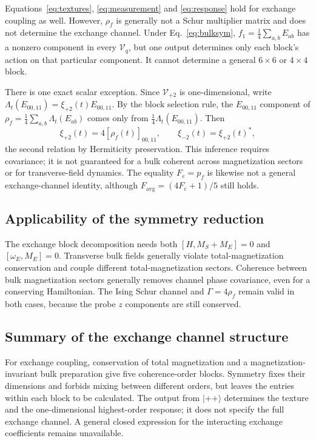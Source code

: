 \documentclass[11pt,a4paper]{article}
\newcommand{\ket}[1]{\lvert #1\rangle}
\begin{document}
Equations~\eqref{eq:textures}, \eqref{eq:measurement} and
\eqref{eq:response} hold for exchange coupling as well. However,
$\rho_f$ is generally not a Schur multiplier matrix and does not
determine the exchange channel. Under Eq.~\eqref{eq:bulksym},
$f_1=\frac14\sum_{a,b}E_{ab}$ has a nonzero component in every
$\mathcal V_q$, but one output determines only each block's action on
that particular component. It cannot determine a general $6\times6$ or
$4\times4$ block.

There is one exact scalar exception. Since $\mathcal V_{+2}$ is
one-dimensional, write $\Lambda_t(E_{00,11})=\xi_{+2}(t)E_{00,11}$. By the
block selection rule, the $E_{00,11}$ component of
$\rho_f=\frac14\sum_{a,b}\Lambda_t(E_{ab})$ comes only from
$\frac14\Lambda_t(E_{00,11})$. Then
\begin{equation}
 \xi_{+2}(t)=4[\rho_f(t)]_{00,11},\qquad
 \xi_{-2}(t)=\xi_{+2}(t)^*,
\end{equation}
the second relation by Hermiticity preservation.
This inference requires covariance; it is not guaranteed for a bulk
coherent across magnetization sectors or for transverse-field dynamics.
The equality $F_e=p_f$ is likewise not a general exchange-channel
identity, although $F_{\mathrm{avg}}=(4F_e+1)/5$ still holds.

\subsection{Applicability of the symmetry reduction}

The exchange block decomposition needs both
$[H,M_S+M_E]=0$ and $[\omega_E,M_E]=0$. Transverse bulk fields generally
violate total-magnetization conservation and couple different
total-magnetization sectors. Coherence between bulk magnetization
sectors generally removes channel phase covariance, even for a conserving
Hamiltonian. The Ising Schur channel and $\Gamma=4\rho_f$ remain valid in
both cases, because the probe $z$ components are still conserved.

\subsection{Summary of the exchange channel structure}

For exchange coupling, conservation of total magnetization and a
magnetization-invariant bulk preparation give five coherence-order
blocks. Symmetry fixes their dimensions and forbids mixing between
different orders, but leaves the entries within each block to be
calculated. The output from $\ket{++}$ determines the texture and the
one-dimensional highest-order response; it does not specify the full
exchange channel. A general closed expression for the interacting
exchange coefficients remains unavailable.
\end{document}

